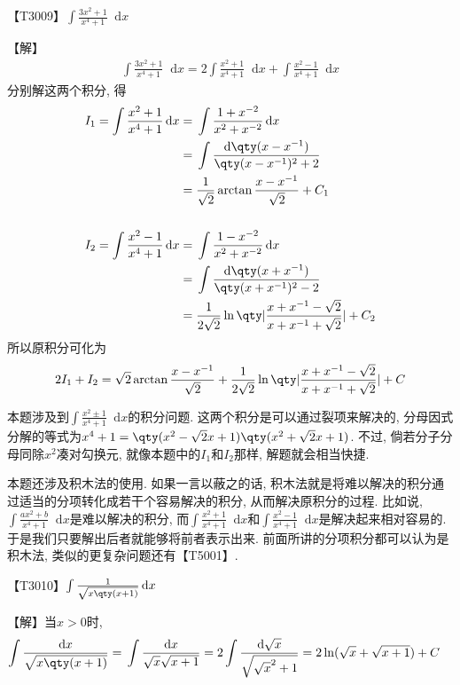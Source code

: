 \documentclass{ctexbook}
\newcommand*{\dif}{\mathop{}\!\mathrm{d}}
\begin{document}
{{\color{red}【T3009】}$\int\frac{3x^{2}+1}{x^{4}+1}\dif{x}$\par
【解】
\begin{align*}
\int\frac{3x^{2}+1}{x^{4}+1}\dif{x}=2\int\frac{x^{2}+1}{x^{4}+1}\dif{x}+\int\frac{x^{2}-1}{x^{4}+1}\dif{x}
\end{align*}
分别解这两个积分, 得
\begin{align*}
I_{1}=\int\frac{x^{2}+1}{x^{4}+1}\dif{x}={}&\int\frac{1+x^{-2}}{x^{2}+x^{-2}}\dif{x}\\
={}&\int\frac{\dif{\qty(x-x^{-1})}}{\qty(x-x^{-1})^{2}+2}\\
={}&\frac{1}{\sqrt{2}}\arctan{\frac{x-x^{-1}}{\sqrt{2}}}+C_{1}\\
\\
I_{2}=\int\frac{x^{2}-1}{x^{4}+1}\dif{x}={}&\int\frac{1-x^{-2}}{x^{2}+x^{-2}}\dif{x}\\
={}&\int\frac{\dif{\qty(x+x^{-1})}}{\qty(x+x^{-1})^{2}-2}\\
={}&\frac{1}{2\sqrt{2}}\ln\qty|\frac{x+x^{-1}-\sqrt{2}}{x+x^{-1}+\sqrt{2}}|+C_{2}
\end{align*}
所以原积分可化为
\begin{align*}
2I_{1}+I_{2}=\sqrt{2}\arctan{\frac{x-x^{-1}}{\sqrt{2}}}+\frac{1}{2\sqrt{2}}\ln\qty|\frac{x+x^{-1}-\sqrt{2}}{x+x^{-1}+\sqrt{2}}|+C
\end{align*}\par
{\kaishu 本题涉及到$\int\frac{x^{2}\pm1}{x^{4}+1}\dif{x}$的积分问题. 这两个积分是可以通过裂项来解决的, 分母因式分解的等式为$x^{4}+1=\qty(x^{2}-\sqrt{2}x+1)\qty(x^{2}+\sqrt{2}x+1)$. 不过, 倘若分子分母同除$x^{2}$凑对勾换元, 就像本题中的$I_{1}$和$I_{2}$那样, 解题就会相当快捷. \par
本题还涉及积木法的使用. 如果一言以蔽之的话, 积木法就是将难以解决的积分通过适当的分项转化成若干个容易解决的积分, 从而解决原积分的过程. 比如说, $\int\frac{ax^{2}+b}{x^{4}+1}\dif{x}$是难以解决的积分, 而$\int\frac{x^{2}+1}{x^{4}+1}\dif{x}$和$\int\frac{x^{2}-1}{x^{4}+1}\dif{x}$是解决起来相对容易的. 于是我们只要解出后者就能够将前者表示出来. 前面所讲的分项积分都可以认为是积木法, 类似的更复杂问题还有【T5001】. \par}
{\color{red}【T3010】}$\int\frac{1}{\sqrt{x\qty(x+1)}}\dif{x}$\par
【解】当$x>0$时, 
\begin{align*}
\int\frac{\dif{x}}{\sqrt{x\qty(x+1)}}={}&\int\frac{\dif{x}}{\sqrt{x}\sqrt{x+1}}=2\int\frac{\dif{\sqrt{x}}}{\sqrt{\sqrt{x}^{2}+1}}=2\ln(\sqrt{x}+\sqrt{x+1})+C
\end{align*}
}
\end{document}
